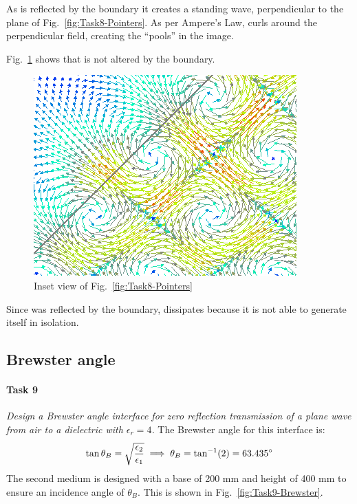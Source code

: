 As  is reflected by the boundary it creates a standing wave, perpendicular to the plane of Fig.~\ref{fig:Task8-Pointers}.
As per Ampere's Law,  curls around the perpendicular  field, creating the ``pools'' in the image. 

Fig.~\ref{fig:Task8-Pointers-Inset} shows that  is not altered by the boundary.
\begin{figure}[tbph]
	\centering
	\includegraphics[width=0.6\linewidth]{graphics/Task8-Pointers-Inset}
	\caption{Inset view of Fig.~\ref{fig:Task8-Pointers}}
	\label{fig:Task8-Pointers-Inset}
\end{figure}
Since  was reflected by the boundary,  dissipates because it is not able to generate itself in isolation.

\subsection{Brewster angle}
\paragraph{Task 9}\textit{Design a Brewster angle interface for zero reflection transmission of a plane wave from air to a dielectric with $\epsilon_r = 4$.}
The Brewster angle for this interface is:
\begin{align*}
	\tan\theta_B = \sqrt{{\epsilon_2 \over \epsilon_1}} \implies \theta_B = \tan^{-1}(2) = \SI{63.435}{\degree} 
\end{align*}
The second medium is designed with a base of 200 mm and height of 400 mm to ensure an incidence angle of $\theta_B$.
This is shown in Fig.~\ref{fig:Task9-Brewster}.

